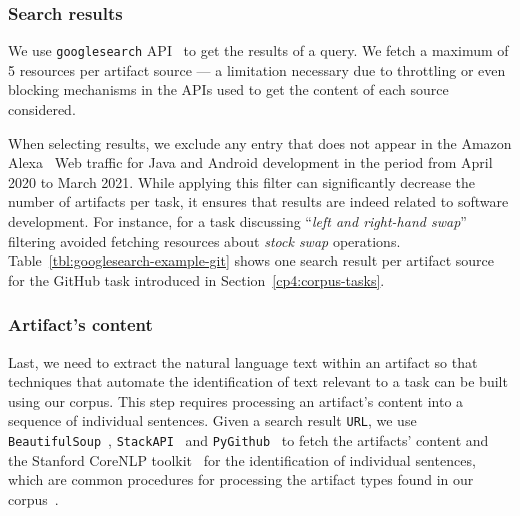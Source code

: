 \subsubsection{Search results}


We use \texttt{googlesearch} API~\cite{googlesearch} to get the results of a query. 
We fetch a maximum of 5 resources per artifact source --- a limitation necessary due to throttling or even blocking mechanisms in the APIs used to get the content of each source considered.


When selecting results, we exclude any entry that does not appear in the Amazon Alexa~\cite{alexa} Web traffic for Java and Android development in the period from April 2020 to March 2021. 
While applying this filter can significantly decrease the number of artifacts per task, it ensures that results are indeed related to software development. 
For instance, for a task discussing ``\textit{left and right-hand swap}'' 
filtering avoided fetching resources about  \textit{stock swap} operations.
Table~\ref{tbl:googlesearch-example-git} shows one search result per artifact source for the GitHub task introduced in Section~\ref{cp4:corpus-tasks}.




\subsubsection{Artifact's content}

Last, we need to extract the natural language text within an artifact so that 
techniques that automate the identification of text relevant to a task can be built 
using our corpus.  This step requires processing an artifact's content 
into a sequence of individual sentences.
Given a search result \texttt{URL}, we use \texttt{BeautifulSoup}~\cite{beautifulsoup4},
\texttt{StackAPI}~\cite{StackAPI} and \texttt{PyGithub}~\cite{PyGithub}
to fetch the artifacts' content
and the Stanford CoreNLP toolkit~\cite{CoreNLP} for the identification of 
individual sentences,
which are common procedures for processing the artifact types found in our corpus~\cite{Arya2019, nadi2020}.








